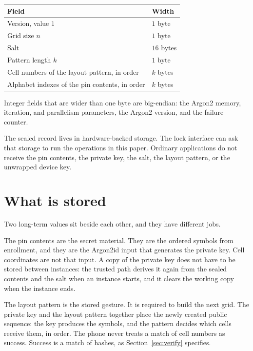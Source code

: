 \documentclass[11pt]{article}
\begin{document}
\begin{center}
\begin{tabular}{@{}ll@{}}
  \toprule
  Field & Width \\
  \midrule
  Version, value \(1\) & \(1\) byte \\
  Grid size \(n\) & \(1\) byte \\
  Salt & \(16\) bytes \\
  Pattern length \(k\) & \(1\) byte \\
  Cell numbers of the layout pattern, in order & \(k\) bytes \\
  Alphabet indexes of the pin contents, in order & \(k\) bytes \\
  \bottomrule
\end{tabular}
\end{center}

Integer fields that are wider than one byte are big-endian:
the Argon2 memory, iteration, and parallelism parameters, the Argon2 version, and the failure counter.

The sealed record lives in hardware-backed storage.
The lock interface can ask that storage to run the operations in this paper.
Ordinary applications do not receive the pin contents, the private key, the salt, the layout pattern, or the unwrapped device key.

\section{What is stored}

Two long-term values sit beside each other, and they have different jobs.

The pin contents are the secret material.
They are the ordered symbols from enrollment, and they are the Argon2id input that generates the private key.
Cell coordinates are not that input.
A copy of the private key does not have to be stored between instances: the trusted path derives it again from the sealed contents and the salt when an instance starts, and it clears the working copy when the instance ends.

The layout pattern is the stored gesture.
It is required to build the next grid.
The private key and the layout pattern together place the newly created public sequence: the key produces the symbols, and the pattern decides which cells receive them, in order.
The phone never treats a match of cell numbers as success.
Success is a match of hashes, as Section~\ref{sec:verify} specifies.
\end{document}
